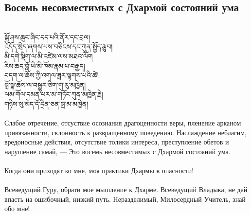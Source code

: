 \subsection*{Восемь несовместимых с Дхармой состояний ума}
\\
\ti
སྐྱོ་ཤས་ཆུང་ཞིང་དད་པའི་ནོར་དང་བྲལ། \\
འདོད་སྲེད་ཞགས་པས་བཅིངས་དང་ཀུན་སྤྱོད་རྩུབ། \\
མི་དགེ་སྡིག་ལ་མི་འཛེམ་ལས་མཐའ་ལོག \\
རིས་ཆད་བློ་ཡི་མི་ཁོམ་རྣམ་པ་བརྒྱད། \\
བདག་ལ་ཆོས་ཀྱི་འགལ་ཟླར་ལྷགས་པའི་ཚེ། \\
བློ་སྣ་ཆོས་ལ་བསྒྱུར་ཅིག་གུ་རུ་མཁྱེན། \\
ལམ་གོལ་དམན་པར་མ་གཏོང་ཀུན་མཁྱེན་རྗེ། \\
གཉིས་སུ་མེད་དོ་དྲིན་ཅན་བླ་མ་མཁྱེན། \\
\\
\ru
Слабое отречение, отсуствие осознания драгоценности веры,
пленение арканом привязанности, склонность к развращенному поведе\-нию.
Наслаждение неблагим, вредоносные действия, отсутствие толики интереса,
преступление обетов и нарушение самай, —
Это восемь несовместимых с Дхармой состояний ума.\\
\\
Когда они приходят ко мне, моя практики Дхармы в опасности!\\
\\
Всеведущий Гуру, обрати мое мышление к Дхарме.
Всеведущий Владыка, не дай впасть на ошибочный, низкий путь.
Нераздели\-мый, Милосердный Учитель, знай обо мне!

\newpage
